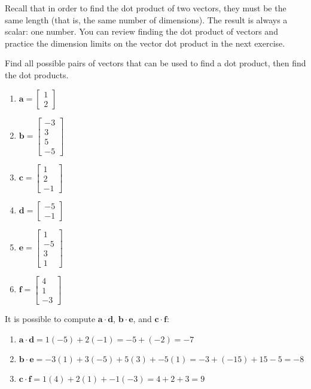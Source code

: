 Recall that in order to find the dot product of two vectors, they must be the
same length (that is, the same number of dimensions). The result is always a
scalar: one number. You can review finding the dot product of vectors and
practice the dimension limits on the vector dot product in the next exercise.

\begin{Exercise}[title = {Vector Dot Product Review}, label = vect_dot]
Find all possible pairs of vectors that can be used to find a dot product,
then find the dot products.
\begin{enumerate}
\item $\mathbf{a} = \begin{bmatrix}
1\\
2
\end{bmatrix}$
\item $\mathbf{b} = \begin{bmatrix}
-3\\
3\\
5\\
-5
\end{bmatrix}$
\item $\mathbf{c} = \begin{bmatrix}
1\\
2\\
-1
\end{bmatrix}$
\item $\mathbf{d} = \begin{bmatrix}
-5\\
-1
\end{bmatrix}$
\item $\mathbf{e} = \begin{bmatrix}
1\\
-5\\
3\\
1
\end{bmatrix}$
\item $\mathbf{f} = \begin{bmatrix}
4\\
1\\
-3
\end{bmatrix}$
\end{enumerate}
\end{Exercise}

\begin{Answer}[ref = vect_dot]
It is possible to compute $\mathbf{a} \cdot \mathbf{d}$, $\mathbf{b} \cdot
\mathbf{e}$, and $\mathbf{c} \cdot \mathbf{f}$:
\begin{enumerate}
    \item $\mathbf{a} \cdot \mathbf{d} = 1(-5) + 2(-1) = -5 + (-2) = -7$
    \item $\mathbf{b} \cdot \mathbf{e} = -3(1) + 3(-5) + 5(3) + -5(1) = -3 +
    (-15) + 15 - 5 = -8$
    \item $\mathbf{c} \cdot \mathbf{f} = 1(4) + 2(1) + -1(-3) = 4 + 2 + 3 = 9$
\end{enumerate}
\end{Answer}


